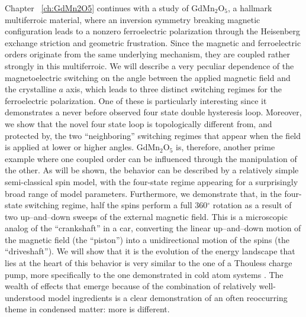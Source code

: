 Chapter ~\ref{ch:GdMn2O5} continues with a study of GdMn$_2$O$_5$, a hallmark multiferroic material, where an inversion symmetry breaking magnetic configuration leads to a nonzero ferroelectric polarization through the Heisenberg exchange striction and geometric frustration.
Since the magnetic and ferroelectric orders originate from the same underlying mechanism, they are coupled rather strongly in this multiferroic.
We will describe a very peculiar dependence of the magnetoelectric switching on the angle between the applied magnetic field and the crystalline $a$ axis, which leads to three distinct switching regimes for the ferroelectric polarization.
One of these is particularly interesting since it demonstrates a never before observed four state double hysteresis loop.
Moreover, we show that the novel four state loop is topologically different from, and protected by, the two ``neighboring'' switching regimes that appear when the field is applied at lower or higher angles.
GdMn$_2$O$_5$ is, therefore, another prime example where one coupled order can be influenced through the manipulation of the other.
As will be shown, the behavior can be described by a relatively simple semi-classical spin model, with the four-state regime appearing for a surprisingly broad range of model parameters.
Furthermore, we demonstrate that, in the four-state switching regime, half the spins perform a full 360$^\circ$ rotation as a result of two up--and--down sweeps of the external magnetic field.
This is a microscopic analog of the ``crankshaft'' in a car, converting the linear up--and--down motion of the magnetic field (the ``piston'') into a unidirectional motion of the spins (the ``driveshaft'').
We will show that it is the evolution of the energy landscape that lies at the heart of this behavior is very similar to the one of a Thouless charge pump, more specifically to the one demonstrated in cold atom systems \cite{Lohse16}.
The wealth of effects that emerge because of the combination of relatively well-understood model ingredients is a clear demonstration of an often reoccurring theme in condensed matter: more is different.  

